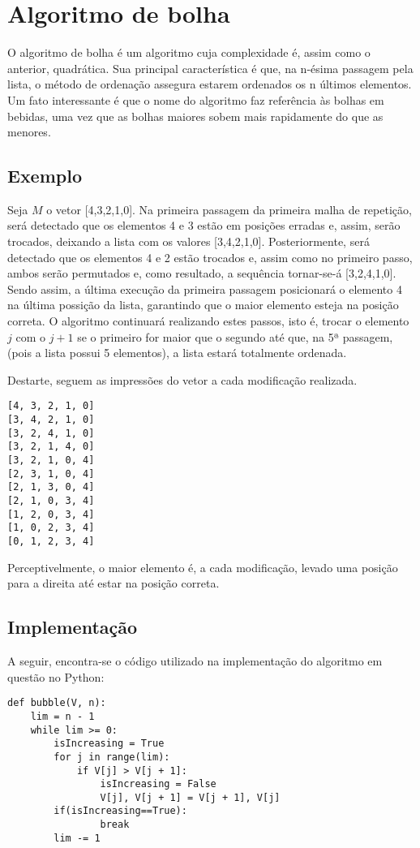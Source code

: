 \section{Algoritmo de bolha}
O algoritmo de bolha é um algoritmo cuja complexidade é, assim como o anterior, quadrática. Sua principal característica é que, na n-ésima passagem pela lista, o método de ordenação assegura estarem ordenados os n últimos elementos.
Um fato interessante é que o nome do algoritmo faz referência às bolhas em bebidas, uma vez que as bolhas maiores sobem mais rapidamente do que as menores.


\subsection{Exemplo}
Seja $M$ o vetor [4,3,2,1,0].
Na primeira passagem da primeira malha de repetição, será detectado que os elementos 4 e 3 estão em posições erradas e, assim, serão trocados, deixando a lista com os valores [3,4,2,1,0]. Posteriormente, será detectado que os elementos 4 e 2 estão trocados e, assim como no primeiro passo, ambos serão permutados e, como resultado, a sequência tornar-se-á [3,2,4,1,0]. Sendo assim, a última execução da primeira passagem posicionará o elemento 4 na última possição da lista, garantindo que o maior elemento esteja na posição correta.
O algoritmo continuará realizando estes passos, isto é, trocar o elemento $j$ com o $j+1$ se o primeiro for maior que o segundo até que, na 5ª passagem, (pois a lista possui 5 elementos), a lista estará totalmente ordenada.

Destarte, seguem as impressões do vetor a cada modificação realizada. 

\begin{lstlisting}
[4, 3, 2, 1, 0]
[3, 4, 2, 1, 0]
[3, 2, 4, 1, 0]
[3, 2, 1, 4, 0]
[3, 2, 1, 0, 4]
[2, 3, 1, 0, 4]
[2, 1, 3, 0, 4]
[2, 1, 0, 3, 4]
[1, 2, 0, 3, 4]
[1, 0, 2, 3, 4]
[0, 1, 2, 3, 4]
\end{lstlisting}

Perceptivelmente, o maior elemento é, a cada modificação, levado uma posição para a direita até estar na posição correta. 
\newpage
\subsection{Implementação}
A seguir, encontra-se o código utilizado na implementação do algoritmo em questão no Python:

\begin{lstlisting}
def bubble(V, n):
    lim = n - 1
    while lim >= 0:
        isIncreasing = True
        for j in range(lim):
            if V[j] > V[j + 1]:
                isIncreasing = False
                V[j], V[j + 1] = V[j + 1], V[j]
        if(isIncreasing==True): 
                break
        lim -= 1
\end{lstlisting}


